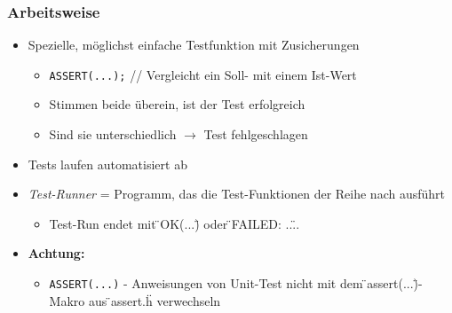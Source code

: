 \subsubsection{Arbeitsweise}
\begin{itemize}
	\item Spezielle, möglichst einfache Testfunktion mit Zusicherungen
	\begin{itemize}
		\item \texttt{ASSERT(...);} // Vergleicht ein Soll- mit einem Ist-Wert
		\item Stimmen beide überein, ist der Test erfolgreich
		\item Sind sie unterschiedlich $\rightarrow$ Test fehlgeschlagen
	\end{itemize}
	\item Tests laufen automatisiert ab
	\item \textit{Test-Runner} = Programm, das die Test-Funktionen der Reihe nach ausführt
	\begin{itemize}
		\item Test-Run endet mit \"{}OK(...)\"{} oder \"{}FAILED: ...\"{}.
	\end{itemize}
	\item \textbf{Achtung: }
	\begin{itemize}
		\item \texttt{ASSERT(...)} - Anweisungen von Unit-Test nicht mit dem \"{}assert(...)\"{}-Makro aus \"{}assert.h\"{} verwechseln
	\end{itemize}
\end{itemize}

